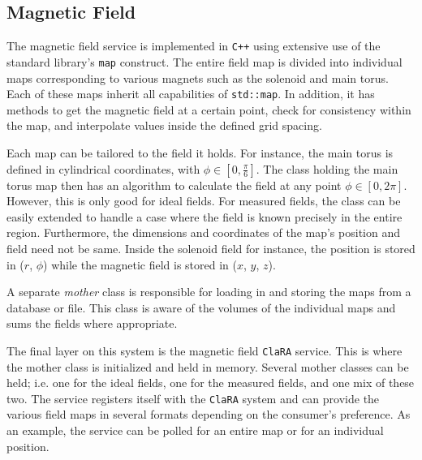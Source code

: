 \subsection{\label{sec:software.services.magneticfield}Magnetic Field}
The magnetic field service is implemented in \texttt{C++} using extensive use of the standard library's \texttt{map} construct. The entire field map is divided into individual maps corresponding to various magnets such as the solenoid and main torus. Each of these maps inherit all capabilities of \texttt{std::map}. In addition, it has methods to get the magnetic field at a certain point, check for consistency within the map, and interpolate values inside the defined grid spacing.

Each map can be tailored to the field it holds. For instance, the main torus is defined in cylindrical coordinates, with $\phi\in[0,\frac{\pi}{6}]$. The class holding the main torus map then has an algorithm to calculate the field at any point $\phi\in[0,2\pi]$. However, this is only good for ideal fields. For measured fields, the class can be easily extended to handle a case where the field is known precisely in the entire region. Furthermore, the dimensions and coordinates of the map's position and field need not be same. Inside the solenoid field for instance, the position is stored in ($r$, $\phi$) while the magnetic field is stored in ($x$, $y$, $z$).

A separate \emph{mother} class is responsible for loading in and storing the maps from a database or file. This class is aware of the volumes of the individual maps and sums the fields where appropriate.

The final layer on this system is the magnetic field \texttt{ClaRA} service. This is where the mother class is initialized and held in memory. Several mother classes can be held; i.e. one for the ideal fields, one for the measured fields, and one mix of these two. The service registers itself with the \texttt{ClaRA} system and can provide the various field maps in several formats depending on the consumer's preference. As an example, the service can be polled for an entire map or for an individual position.
